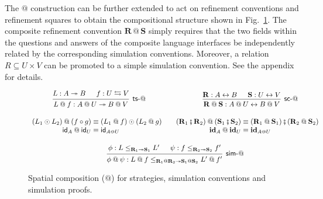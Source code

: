 \documentclass[acmsmall,nonacm]{acmart}
\newcommand{\kw}[1]{\ensuremath{ \mathsf{#1} }}
\newcommand{\lensarrow}{\leftrightarrows}
\newcommand{\idsc}{\mathbf{id}} %
\newcommand{\vcomp}{\fatsemi}
\begin{document}
The $\mathbin@$ construction can be further extended
to act on refinement conventions and refinement squares
to obtain the compositional structure shown in Fig.~\ref{fig:xcomp}.
The composite refinement convention $\mathbf{R} \mathbin@ \mathbf{S}$
simply requires that the two fields within the questions and answers
of the composite language interfaces
be independently related by the corresponding simulation conventions.
Moreover, a relation $R \subseteq U \times V$
can be promoted to a simple simulation convention.
See the appendix for details.


\begin{figure} %
  \begin{gather*}
    \begin{prooftree}
      \hypo{L : A \twoheadrightarrow B}
      \hypo{f : U \lensarrow V}
      \infer2[\kw{ts}-$\mathbin@$]{
        L \mathbin@ f : A \mathbin@ U \twoheadrightarrow B \mathbin@ V
      }
    \end{prooftree}
    \hspace{8em}
    \begin{prooftree}
      \hypo{\mathbf{R} : A \leftrightarrow B}
      \hypo{\mathbf{S} : U \leftrightarrow V}
      \infer2[\kw{sc}-$\mathbin@$]{
        \mathbf{R} \mathbin@ \mathbf{S} : A \mathbin@ U \leftrightarrow B \mathbin@ V
      }
    \end{prooftree}
    \\[1em]
    \begin{array}{r@{}l}
      (L_1 \odot L_2) \mathbin@ (f \circ g) & {} \equiv
      (L_1 \mathbin@ f) \odot (L_2 \mathbin@ g) \\
      \kw{id}_A \mathbin@ \kw{id}_U & {} \equiv \kw{id}_{A \mathbin@ U}
    \end{array}
    \quad
    \begin{array}{r@{}l}
      (\mathbf{R}_1 \vcomp \mathbf{R}_2) \mathbin@ (\mathbf{S}_1 \vcomp \mathbf{S}_2)
      & {} \equiv
      (\mathbf{R}_1 \mathbin@ \mathbf{S}_1) \vcomp (\mathbf{R}_2 \mathbin@ \mathbf{S}_2)
      \\
      \idsc_A \mathbin@ \idsc_U & {} \equiv \idsc_{A \mathbin@ U}
    \end{array}
    \\[1em]
    \begin{prooftree}
      \hypo{\phi: L \le_{\mathbf{R}_1 \twoheadrightarrow \mathbf{S}_1} L'}
      \hypo{\psi: f \le_{\mathbf{R}_2 \twoheadrightarrow \mathbf{S}_2} f'}
      \infer2[\kw{sim}-$\mathbin@$]{\phi \mathbin@ \psi :
	L \mathbin@ f
        \le_{\mathbf{R}_1 \mathbin@ \mathbf{R}_2 \twoheadrightarrow
             \mathbf{S}_1 \mathbin@ \mathbf{S}_2}
	L' \mathbin@ f'}
    \end{prooftree}
  \end{gather*}
  \caption{Spatial composition ($\mathbin@$) for strategies,
    simulation conventions and simulation proofs.}
  \label{fig:xcomp}
\end{figure}
\end{document}
